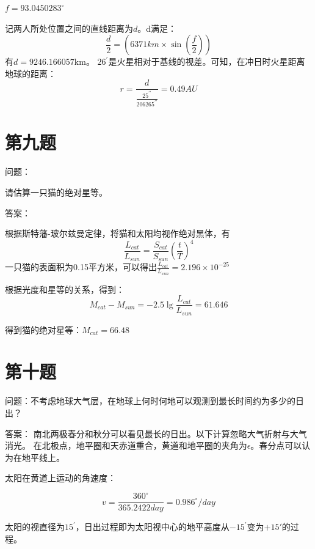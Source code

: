 \documentclass[a4paper,12pt]{report}
\begin{document}
\noindent $f=93.0450283^\circ$
	
\noindent 记两人所处位置之间的直线距离为$d$。d满足：
\begin{equation}
	\frac{d}{2}=(6371km\times \sin(\frac{f}{2}))
\end{equation}
有$d=9246.166057$km。
$26^\prime$是火星相对于基线的视差。可知，在冲日时火星距离地球的距离：
\begin{equation}
	r=\frac{d}{\frac{25^{\prime\prime}}{206265^{\prime\prime}}}=0.49AU
\end{equation}

\section{第九题}
\noindent 问题：

请估算一只猫的绝对星等。

\noindent 答案：

\noindent 根据斯特藩-玻尔兹曼定律，将猫和太阳均视作绝对黑体，有
\begin{equation}
	\frac{L_{cat}}{L_{sun}}=\frac{S_{cat}}{S_{sun}}(\frac{t}{T})^4
\end{equation}
\noindent 一只猫的表面积为0.15平方米，可以得出$\frac{L_{cat}}{L_{sun}}=2.196\times 10^{-25}$

\noindent 根据光度和星等的关系，得到：
\begin{equation}
	M_{cat}-M_{sun}=-2.5\lg\frac{L_{cat}}{L_{sun}}=61.646
\end{equation}

\noindent 得到猫的绝对星等：$M_{cat}=66.48$

\section{第十题}

\noindent 问题：不考虑地球大气层，在地球上何时何地可以观测到最长时间约为多少的日出？

\noindent 答案：
\noindent 南北两极春分和秋分可以看见最长的日出。以下计算忽略大气折射与大气消光。
在北极点，地平圈和天赤道重合，黄道和地平圈的夹角为$\epsilon$。春分点可以认为在地平线上。

太阳在黄道上运动的角速度：

\begin{equation}
	v=\frac{360^{\circ}}{365.2422day}=0.986^{\circ}/day
\end{equation}

太阳的视直径为$15^\prime $，日出过程即为太阳视中心的地平高度从$-15^\prime$变为$+15\prime$的过程。
\end{document}
